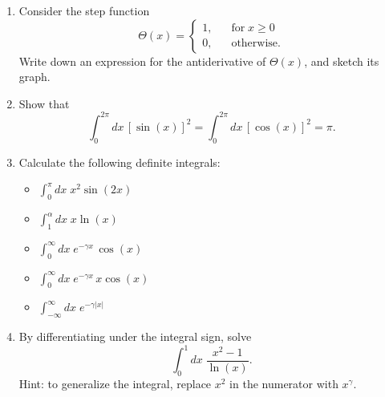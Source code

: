 \documentclass[10pt,a4paper]{article}
\begin{document}
\begin{enumerate}
\item 
  Consider the step
function
\begin{equation}
  \Theta(x) = \left\{\begin{array}{ll} 1, &\;\;\;\textrm{for} \; x \ge 0\\ 0,&\;\;\; \textrm{otherwise.}\end{array}\right.
\end{equation}
Write down an expression for the antiderivative of $\Theta(x)$, and
sketch its graph.

\item
Show that
\begin{equation}\int_0^{2\pi} dx\, [\sin(x)]^2 =
\int_0^{2\pi} dx\, [\cos(x)]^2 = \pi.
\end{equation}

\item
Calculate the following definite integrals:
\begin{itemize}
\item
  $\displaystyle\int_{0}^\pi dx\; x^2 \sin(2x)$
\item
  $\displaystyle\int_{1}^\alpha dx\; x \ln(x)$
\item
  $\displaystyle\int_0^\infty dx\;e^{-\gamma x} \, \cos(x)$
\item
  $\displaystyle\int_0^\infty dx\;e^{-\gamma x} \, x \cos(x)$
\item
  $\displaystyle\int_{-\infty}^\infty dx\;e^{-\gamma |x|}$
\end{itemize}

\item
  By differentiating under the integral sign, solve
  \begin{equation}
    \int_0^1 dx\; \frac{x^2-1}{\ln(x)}.
  \end{equation}
  Hint: to generalize the integral, replace $x^2$ in the numerator
  with $x^\gamma$.
\end{enumerate}
    
    
\end{document}
